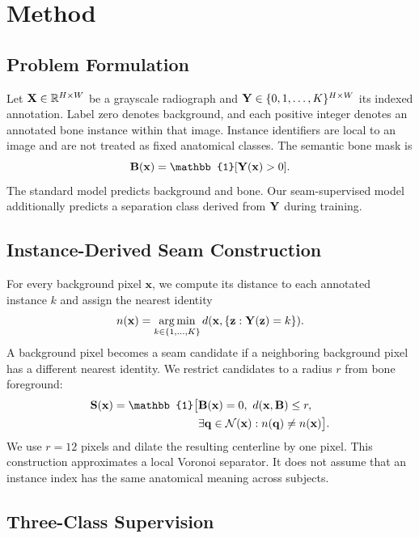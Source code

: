 \section{Method}

\subsection{Problem Formulation}

Let $\mathbf{X}\in\mathbb{R}^{H\times W}$ be a grayscale radiograph and $\mathbf{Y}\in\{0,1,\ldots,K\}^{H\times W}$ its indexed annotation. Label zero denotes background, and each positive integer denotes an annotated bone instance within that image. Instance identifiers are local to an image and are not treated as fixed anatomical classes. The semantic bone mask is
\begin{equation}
\B(\mathbf{x})=\mathbb{1}[\Y(\mathbf{x})>0].
\end{equation}
The standard model predicts background and bone. Our seam-supervised model additionally predicts a separation class derived from $\mathbf{Y}$ during training.

\subsection{Instance-Derived Seam Construction}

For every background pixel $\mathbf{x}$, we compute its distance to each annotated instance $k$ and assign the nearest identity
\begin{equation}
n(\mathbf{x})=\operatorname*{arg\,min}_{k\in\{1,\ldots,K\}} d(\mathbf{x},\{\mathbf{z}:\mathbf{Y}(\mathbf{z})=k\}).
\end{equation}
A background pixel becomes a seam candidate if a neighboring background pixel has a different nearest identity. We restrict candidates to a radius $r$ from bone foreground:
\begin{align}
\Smap(\mathbf{x})=\mathbb{1}\big[&\B(\mathbf{x})=0,\ d(\mathbf{x},\B)\le r,\nonumber\\
&\exists\mathbf{q}\in\mathcal{N}(\mathbf{x}):n(\mathbf{q})\ne n(\mathbf{x})\big].
\end{align}
We use $r=12$ pixels and dilate the resulting centerline by one pixel. This construction approximates a local Voronoi separator. It does not assume that an instance index has the same anatomical meaning across subjects.

\subsection{Three-Class Supervision}

